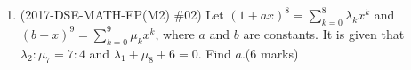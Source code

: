 \documentclass[12pt]{article}
\begin{document}
\begin{enumerate}
            \hrulefill
            
            \hrulefill
            
            \hrulefill
            
            \hrulefill
            
            \hrulefill
            
            \hrulefill
            
            \hrulefill
            
            \hrulefill
            
            \hrulefill
            
            \hrulefill
            
            \hrulefill

        \pagebreak
        \item (2017-DSE-MATH-EP(M2) \#02) Let $\displaystyle (1+ax)^8=\sum_{k=0}^8 \lambda_k x^k$ and $\displaystyle(b+x)^9=\sum_{k=0}^9 \mu_k x^k$, where $a$ and $b$ are constants. It is given that $\lambda_2:\mu_7=7:4$ and $\lambda_1+\mu_8+6=0$. Find $a$.\hfill(6 marks)
        
        \hrulefill
            
        \hrulefill
        
        \hrulefill
        
        \hrulefill
        
        \hrulefill
        
        \hrulefill
        
        \hrulefill
        
        \hrulefill
        
        \hrulefill
        
        \hrulefill
        
        \hrulefill
        
        \hrulefill
        
        \hrulefill
        
        \hrulefill
        
        \hrulefill
        
        \hrulefill
        
        \hrulefill
        
        \hrulefill
        
        \hrulefill
        
        \hrulefill
        
        \hrulefill
        

\end{enumerate}
\end{document}
